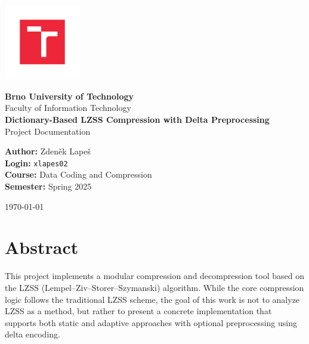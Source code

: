 \documentclass[a4paper,12pt]{article}
\begin{document}
    \begin{titlepage}
        \centering
        \vspace*{1cm}

        \includegraphics[width=0.25\textwidth]{template-fig/VUT_symbol_barevne_CMYK_CZ}\par\vspace{1cm} %

        {\Large\textbf{Brno University of Technology}}\\[0.5cm]
        {\large Faculty of Information Technology}\\[2cm]

        {\huge\bfseries Dictionary-Based LZSS Compression with Delta Preprocessing}\\[0.5cm]

        {\large Project Documentation}\\[2cm]

        \begin{flushleft}
            \textbf{Author:} Zdeněk Lapeš\\
            \textbf{Login:} \texttt{xlapes02}\\
            \textbf{Course:} Data Coding and Compression\\
            \textbf{Semester:} Spring 2025
        \end{flushleft}

        \vfill

        {\large \today}

    \end{titlepage}

    \tableofcontents
    \newpage


    \section*{Abstract}
    This project implements a modular compression and decompression tool based on the LZSS (Lempel–Ziv–Storer–Szymanski) algorithm. While the core compression logic follows the traditional LZSS scheme, the goal of this work is not to analyze LZSS as a method, but rather to present a concrete implementation that supports both static and adaptive approaches with optional preprocessing using delta encoding.
\end{document}
